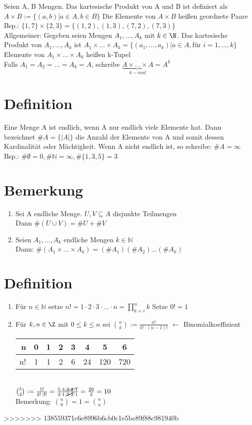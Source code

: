 \Def
Seien A, B Mengen. Das kartesische Produkt von A und B ist definiert als $A × B := \{(a,b)|a\in A, b \in B\}$ Die Elemente von $A × B$ heißen geordnete Paare\\
Bsp.: $\{1,7\}\times \{2,3\}=\{(1,2),(1,3),(7,2),(7,3)\}$\\
Allgemeiner: Gegeben seien Mengen
$A_1,…,A_k$ mit $k \in \N$. Das kartesische Produkt von $A_1,…,A_k$ ist $A_1\times …\times A_k = \{(a_1,…,a_k)|a\in A, $für $i=1,…,k\}$\\
Elemente von $A_1 × … × A_k$ heißen k-Tupel\\
Falls $A_1=A_2=…=A_k=A$, schreibe $\underbrace{A\times…\times A}_{k-mal}=A^k$

\section{Definition}
Eine Menge A ist endlich, wenn A nur endlich viele Elemente hat. Dann bezeichnet
$\#A = \{|A|\}$ die Anzahl der Elemente von A und somit dessen Kardinalit\"at
oder M\"achtigkeit. Wenn A nicht endlich ist, so schreibe: $\# A= \infty$\\
Bsp.: $\#\emptyset = 0, \#\mathds{N}=\infty, \# \{1,3,5\} = 3$

\section{Bemerkung}
\begin{enumerate}
\item Sei A endliche Menge. $U,V\subseteq A$ disjunkte Teilmengen\\
Dann $\#(U\cup V)=\# U + \# V$ 
\item Seien $A_1,...,A_k$ endliche Mengen $k \in \mathds{N}$\\
Dann: $\#(A_1 \times ... \times A_k)=(\#A_1)(\#A_2)...(\#A_k)$
\end{enumerate}

\section{Definition}
\begin{enumerate}
\item Für $n\in \mathds{N}$ setze $n!=1\cdot 2\cdot 3\cdot ... \cdot n=\prod_{k=i}^n k$
Setze $0!=1$
\item Für $k,n\in \Z$ mit $0\le k \le n$ sei ${n \choose k} := \frac{n!}{k!\cdot(n-1)!}$ $\leftarrow$ Binomialkoeffizient\\
\begin{tabular}{r|c|c|c|c|c|c|c}
n & 0 & 1 & 2 & 3 & 4 & 5 & 6\\ \hline
n! & 1 & 1 & 2 & 6 & 24 & 120 & 720
\end{tabular}\\
\bsp
${5 \choose 2} := \frac{5!}{2!\cdot 3!} = \frac{5\cdot 4 \cdot\cancel{3 \cdot 2 \cdot 1}}{2\cdot 1\cdot \cancel{3\cdot 2}\cdot 1 } = \frac{20}{2}=10$\\
Bemerkung: ${ n \choose 0 }= 1 = {n \choose n}$
\end{enumerate}
>>>>>>> 138559371c6e8996b6cb0c1e5be89f88c981940b
